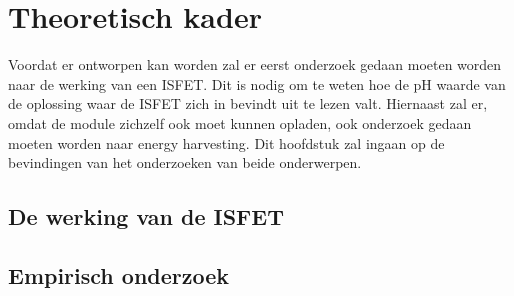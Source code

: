 \section{Theoretisch kader}
Voordat er ontworpen kan worden zal er eerst onderzoek gedaan moeten worden naar de werking van een ISFET. Dit is nodig om te weten hoe de pH waarde van de oplossing waar de ISFET zich in bevindt uit te lezen valt.
Hiernaast zal er, omdat de module zichzelf ook moet kunnen opladen, ook onderzoek gedaan moeten worden naar energy harvesting.
Dit hoofdstuk zal ingaan op de bevindingen van het onderzoeken van beide onderwerpen.

\subsection{De werking van de ISFET}\label{sec:werkingISFET}


\subsection{Empirisch onderzoek}



